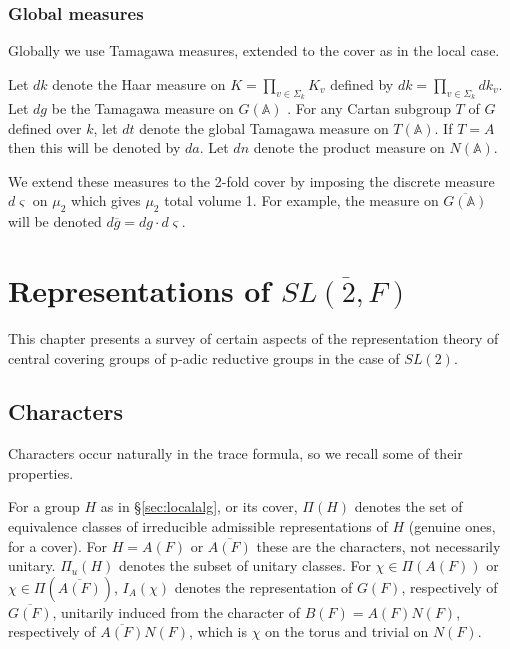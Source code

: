 \documentclass[12pt,letterpaper,openany]{book}
\theoremstyle{plain}
\theoremstyle{definition}
\theoremstyle{remark}
\theoremstyle{remark}
\begin{document}
\subsection{Global measures}

Globally we use Tamagawa measures, extended to the cover as in the local case.


Let $dk$ denote the Haar measure on $K=\prod_{v\in \Sigma_k }K_v$
defined by $dk=\prod_{v\in \Sigma_k }dk_v$.
Let $dg$ be the Tamagawa measure on
$G({\mathbb{A}})$ \cite{W2}. For any Cartan subgroup
$T$ of $G$ defined over $k$, let $dt$
denote the global Tamagawa measure on
$T({\mathbb{A}})$. If $T=A$ then this will
be denoted by $da$. Let $dn$ denote the product measure on $N({\mathbb{A}})$.

We extend these measures to the 2-fold cover by imposing the discrete
measure $d\varsigma $ on $\mu _2$ which gives $\mu _2$ total volume 1. For
example, the measure on $\overline{G({\mathbb{A}})}$ will be denoted
$d\overline{g}=dg\cdot d\varsigma $.



\chapter{Representations of \texorpdfstring{$\overline{SL(2,F)}$}{SL(2,F)-bar}}\label{ch:reps}

This chapter presents a survey of certain aspects of the
representation theory of central covering groups of p-adic reductive groups
in the case of $SL(2)$.

\section{Characters}\label{sec:chars}

Characters occur naturally in the trace formula, so we recall
some of their properties.

For a group $H$ as in \S\ref{sec:localalg}, or its cover, $\Pi(H)$ denotes
the set of equivalence classes of irreducible admissible representations
of $H$ (genuine ones, for a cover). For $H=A(F)$ or $\overline{A(F)}$ these
are the characters, not necessarily unitary. $\Pi_u(H)$ denotes the subset
of unitary classes. For $\chi\in\Pi(A(F))$ or $\chi\in\Pi(\overline{A(F)})$,
$I_A(\chi)$ denotes the representation of $G(F)$, respectively of
$\overline{G(F)}$, unitarily induced from the character of $B(F)=A(F)N(F)$,
respectively of $\overline{A(F)}N(F)$, which is $\chi$ on the torus and
trivial on $N(F)$.
\end{document}
